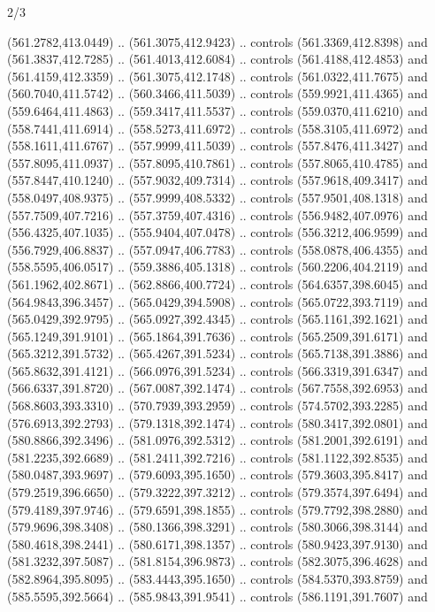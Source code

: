 \begin{flagdescription}{2/3}
\begin{scope}[xshift=0.5\flaglength,yshift=0.5\flagwidth,scale=\flagwidth/495.65]
\begin{scope}[y=0.8pt, x=0.8pt, yscale=-1,shift={(-463.76,-309.78)}]
  (561.2782,413.0449) .. (561.3075,412.9423) .. controls (561.3369,412.8398) and
  (561.3837,412.7285) .. (561.4013,412.6084) .. controls (561.4188,412.4853) and
  (561.4159,412.3359) .. (561.3075,412.1748) .. controls (561.0322,411.7675) and
  (560.7040,411.5742) .. (560.3466,411.5039) .. controls (559.9921,411.4365) and
  (559.6464,411.4863) .. (559.3417,411.5537) .. controls (559.0370,411.6210) and
  (558.7441,411.6914) .. (558.5273,411.6972) .. controls (558.3105,411.6972) and
  (558.1611,411.6767) .. (557.9999,411.5039) .. controls (557.8476,411.3427) and
  (557.8095,411.0937) .. (557.8095,410.7861) .. controls (557.8065,410.4785) and
  (557.8447,410.1240) .. (557.9032,409.7314) .. controls (557.9618,409.3417) and
  (558.0497,408.9375) .. (557.9999,408.5332) .. controls (557.9501,408.1318) and
  (557.7509,407.7216) .. (557.3759,407.4316) .. controls (556.9482,407.0976) and
  (556.4325,407.1035) .. (555.9404,407.0478) .. controls (556.3212,406.9599) and
  (556.7929,406.8837) .. (557.0947,406.7783) .. controls (558.0878,406.4355) and
  (558.5595,406.0517) .. (559.3886,405.1318) .. controls (560.2206,404.2119) and
  (561.1962,402.8671) .. (562.8866,400.7724) .. controls (564.6357,398.6045) and
  (564.9843,396.3457) .. (565.0429,394.5908) .. controls (565.0722,393.7119) and
  (565.0429,392.9795) .. (565.0927,392.4345) .. controls (565.1161,392.1621) and
  (565.1249,391.9101) .. (565.1864,391.7636) .. controls (565.2509,391.6171) and
  (565.3212,391.5732) .. (565.4267,391.5234) .. controls (565.7138,391.3886) and
  (565.8632,391.4121) .. (566.0976,391.5234) .. controls (566.3319,391.6347) and
  (566.6337,391.8720) .. (567.0087,392.1474) .. controls (567.7558,392.6953) and
  (568.8603,393.3310) .. (570.7939,393.2959) .. controls (574.5702,393.2285) and
  (576.6913,392.2793) .. (579.1318,392.1474) .. controls (580.3417,392.0801) and
  (580.8866,392.3496) .. (581.0976,392.5312) .. controls (581.2001,392.6191) and
  (581.2235,392.6689) .. (581.2411,392.7216) .. controls (581.1122,392.8535) and
  (580.0487,393.9697) .. (579.6093,395.1650) .. controls (579.3603,395.8417) and
  (579.2519,396.6650) .. (579.3222,397.3212) .. controls (579.3574,397.6494) and
  (579.4189,397.9746) .. (579.6591,398.1855) .. controls (579.7792,398.2880) and
  (579.9696,398.3408) .. (580.1366,398.3291) .. controls (580.3066,398.3144) and
  (580.4618,398.2441) .. (580.6171,398.1357) .. controls (580.9423,397.9130) and
  (581.3232,397.5087) .. (581.8154,396.9873) .. controls (582.3075,396.4628) and
  (582.8964,395.8095) .. (583.4443,395.1650) .. controls (584.5370,393.8759) and
  (585.5595,392.5664) .. (585.9843,391.9541) .. controls (586.1191,391.7607) and

\end{scope}
\end{scope}
\end{flagdescription}
